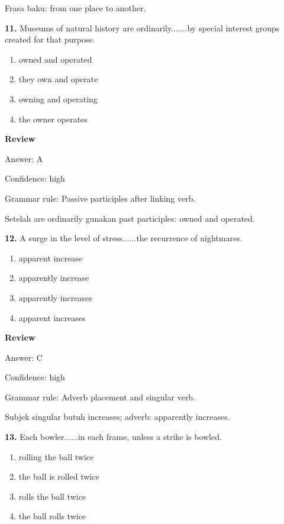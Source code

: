 \documentclass[12pt]{article}
\begin{document}
Frasa baku: from one place to another.\par
\endgroup
\par
\vspace{0.25\baselineskip}
\noindent\textbf{11.} Museums of natural history are ordinarily.......by special interest groups created for that purpose.
\begin{enumerate}[label=(\Alph*),leftmargin=*,itemsep=0.2em]
\item owned and operated
\item they own and operate
\item owning and operating
\item the owner operates
\end{enumerate}
\par
\begingroup
\setlength{\parskip}{0pt}
\setlength{\parindent}{0pt}
\textbf{Review}\par
Answer: A\par
Confidence: high\par
Grammar rule: Passive participles after linking verb.\par
Setelah are ordinarily gunakan past participles: owned and operated.\par
\endgroup
\par
\vspace{0.25\baselineskip}
\noindent\textbf{12.} A surge in the level of stress......the recurrence of nightmares.
\begin{enumerate}[label=(\Alph*),leftmargin=*,itemsep=0.2em]
\item apparent increase
\item apparently increase
\item apparently increases
\item apparent increases
\end{enumerate}
\par
\begingroup
\setlength{\parskip}{0pt}
\setlength{\parindent}{0pt}
\textbf{Review}\par
Answer: C\par
Confidence: high\par
Grammar rule: Adverb placement and singular verb.\par
Subjek singular butuh increases; adverb: apparently increases.\par
\endgroup
\par
\vspace{0.25\baselineskip}
\noindent\textbf{13.} Each bowler......in each frame, unless a strike is bowled.
\begin{enumerate}[label=(\Alph*),leftmargin=*,itemsep=0.2em]
\item rolling the ball twice
\item the ball is rolled twice
\item rolls the ball twice
\item the ball rolls twice
\end{enumerate}
\end{document}

